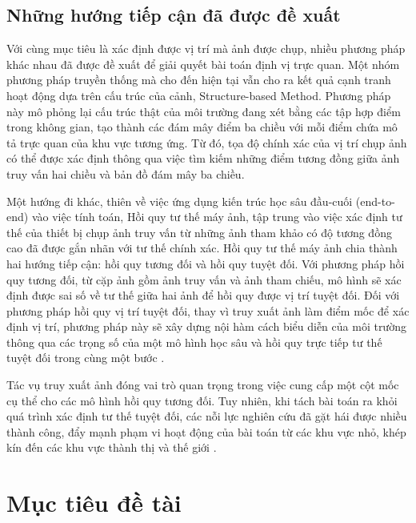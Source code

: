 \subsection{Những hướng tiếp cận đã được đề xuất}

Với cùng mục tiêu là xác định được vị trí mà ảnh được chụp, nhiều phương pháp khác nhau đã được đề xuất để giải quyết bài toán định vị trực quan. Một nhóm phương pháp truyền thống mà cho đến hiện tại vẫn cho ra kết quả cạnh tranh hoạt động dựa trên cấu trúc của cảnh, Structure-based Method. Phương pháp này mô phỏng lại cấu trúc thật của môi trường đang xét bằng các tập hợp điểm trong không gian, tạo thành các đám mây điểm ba chiều với mỗi điểm chứa mô tả trực quan của khu vực tương ứng. Từ đó, tọa độ chính xác của vị trí chụp ảnh có thể được xác định thông qua việc tìm kiếm những điểm tương đồng giữa ảnh truy vấn hai chiều và bản đồ đám mây ba chiều.

Một hướng đi khác, thiên về việc ứng dụng kiến trúc học sâu đầu-cuối (end-to-end) vào việc tính toán, Hồi quy tư thế máy ảnh, tập trung vào việc xác định tư thế của thiết bị chụp ảnh truy vấn từ những ảnh tham khảo có độ tương đồng cao đã được gắn nhãn với tư thế chính xác. Hồi quy tư thế máy ảnh chia thành hai hướng tiếp cận: hồi quy tương đối và hồi quy tuyệt đối. Với phương pháp hồi quy tương đối, từ cặp ảnh gồm ảnh truy vấn và ảnh tham chiếu, mô hình sẽ xác định được sai số về tư thế giữa hai ảnh \cite{zhou2020learn} để hồi quy được vị trí tuyệt đối. Đối với phương pháp hồi quy vị trí tuyệt đối, thay vì truy xuất ảnh làm điểm mốc để xác định vị trí, phương pháp này sẽ xây dựng nội hàm cách biểu diễn của môi trường thông qua các trọng số của một mô hình học sâu và hồi quy trực tiếp tư thế tuyệt đối trong cùng một bước \cite{kendall2016posenet}.

Tác vụ truy xuất ảnh đóng vai trò quan trọng trong việc cung cấp một cột mốc cụ thể cho các mô hình hồi quy tương đối. Tuy nhiên, khi tách bài toán ra khỏi quá trình xác định tư thế tuyệt đối, các nỗi lực nghiên cứu đã gặt hái được nhiều thành công, đẩy mạnh phạm vi hoạt động của bài toán từ các khu vực nhỏ, khép kín đến các khu vực thành thị và thế giới \cite{berton2022rethinking, keetha2023anyloc, alibey2023mixvpr}.

\section{Mục tiêu đề tài}

